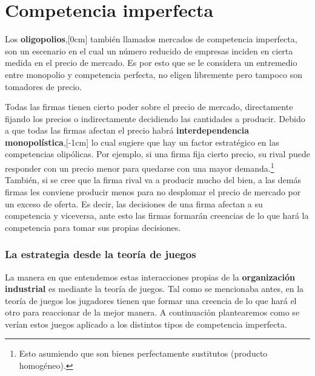 \section{Competencia imperfecta}

Los \textbf{oligopolios},[0cm] también llamados mercados de competencia imperfecta, son un escenario en el cual un número reducido de empresas inciden en cierta medida en el precio de mercado. Es por esto que se le considera un entremedio entre monopolio y competencia perfecta, no eligen libremente pero tampoco son tomadores de precio. 

Todas las firmas tienen cierto poder sobre el precio de mercado, directamente fijando los precios o indirectamente decidiendo las cantidades a producir. Debido a que todas las firmas afectan el precio habrá \textbf{interdependencia monopolística},[-1cm] lo cual sugiere que hay un factor estratégico en las competencias olipólicas. Por ejemplo, si una firma fija cierto precio, su rival puede responder con un precio menor para quedarse con una mayor demanda.\footnote{Esto asumiendo que son bienes perfectamente sustitutos (producto homogéneo).} También, si se cree que la firma rival va a producir mucho del bien, a las demás firmas les conviene producir menos para no desplomar el precio de mercado por un exceso de oferta. Es decir, las decisiones de una firma afectan a su competencia y viceversa, ante esto las firmas formarán creencias de lo que hará la competencia para tomar sus propias decisiones. 

\subsubsection*{La estrategia desde la teoría de juegos}

La manera en que entendemos estas interacciones propias de la \textbf{organización industrial} es mediante la teoría de juegos. Tal como se mencionaba antes, en la teoría de juegos los jugadores tienen que formar una creencia de lo que hará el otro para reaccionar de la mejor manera. A continuación plantearemos como se verían estos juegos aplicado a los distintos tipos de competencia imperfecta. 

